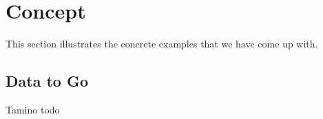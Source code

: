 \section{Concept}

This section illustrates the concrete examples that we have come up with.

\subsection{Data to Go}

Tamino todo